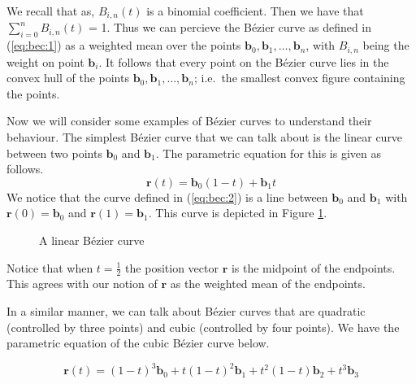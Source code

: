 \documentclass{article}
\begin{document}
We recall that as, $B_{i,n}(t)$ is a binomial coefficient.
Then we have that  $\sum_{i=0}^n B_{i,n}(t)$ = 1.
Thus we can percieve the B\'ezier curve as defined in (\ref{eq:bec:1}) as a weighted mean over the points $\mathbf{b}_0, \mathbf{b}_1, \dots, \mathbf{b}_n$, with $B_{i,n}$ being the weight on point $\mathbf{b}_i$. %
It follows that every point on the B\'ezier curve lies in the convex hull of the points $\mathbf{b}_0, \mathbf{b}_1, \dots, \mathbf{b}_n$; i.e.\ the smallest convex figure containing the points.

Now we will consider some examples of B\'ezier curves to understand their behaviour.
The simplest B\'ezier curve that we can talk about is the linear curve between two points $\mathbf{b}_0$ and $\mathbf{b}_1$.
The parametric equation for this is given as follows.
\begin{equation}
  \label{eq:bec:2}
  \mathbf{r}(t) = \mathbf{b}_0 (1 - t) + \mathbf{b}_1 t
\end{equation}
We notice that the curve defined in (\ref{eq:bec:2}) is a line between $\mathbf{b}_0$ and $\mathbf{b}_1$ with $\mathbf{r}(0) = \mathbf{b}_0$ and $\mathbf{r}(1) = \mathbf{b}_1$. This curve is depicted in Figure \ref{fig:bec:1}.


\begin{figure}
  \centering
  \caption{A linear B\'ezier curve}
  \label{fig:bec:1}
\end{figure}
  
Notice that when $t = \frac{1}{2}$ the position vector $\mathbf{r}$ is the midpoint of the endpoints.
This agrees with our notion of $\mathbf{r}$ as the weighted mean of the endpoints.

In a similar manner, we can talk about B\'ezier curves that are quadratic (controlled by three points) and cubic (controlled by four points). We have the parametric equation of the cubic B\'ezier curve below.

\begin{equation}
  \label{eq:bec:3}
  \mathbf{r}(t) = (1-t)^3 \mathbf{b}_0 + t(1-t)^2 \mathbf{b}_1 + t^2(1-t) \mathbf{b}_2 + t^3 \mathbf{b}_3
\end{equation}
\end{document}
